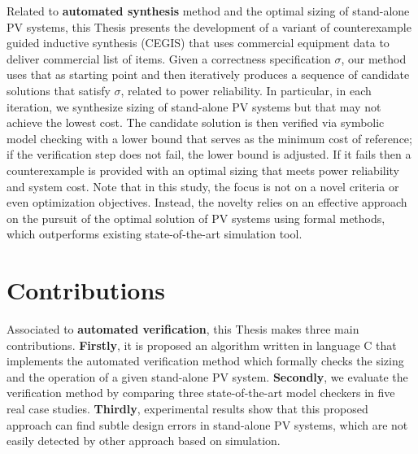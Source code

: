 Related to \textbf{automated synthesis} method and the optimal sizing of stand-alone PV systems, this Thesis presents the development of a variant of counterexample guided inductive synthesis (CEGIS) that uses commercial equipment data to deliver commercial list of items. 
Given a correctness specification $\sigma$, our method uses that as starting point 
and then iteratively produces a sequence of candidate solutions that satisfy $\sigma$, 
related to power reliability. In particular, in each iteration, we synthesize sizing of 
stand-alone PV systems but that may not achieve the lowest cost. The candidate solution 
is then verified via symbolic model checking with a lower bound that serves as the minimum 
cost of reference; if the verification step does not fail, the lower bound is adjusted. 
If it fails then a counterexample is provided with an optimal sizing that meets 
power reliability and system cost. Note that in this study, the focus is not on a novel criteria or even optimization objectives. Instead, the novelty relies on an effective approach on the pursuit of the optimal solution of PV systems using formal methods, which outperforms existing state-of-the-art simulation tool.


\section{Contributions}
Associated to \textbf{automated verification}, this Thesis makes three main contributions. %
\textbf{Firstly}, it is proposed an algorithm written in language C that implements the automated verification method which formally checks the sizing and the operation of a given stand-alone PV system. 
\textbf{Secondly}, we evaluate the verification method by comparing three state-of-the-art model checkers in five real case studies. 
\textbf{Thirdly}, experimental results show that this proposed approach can find subtle design errors in stand-alone PV systems, which are not easily detected by other approach based on simulation. 
%


